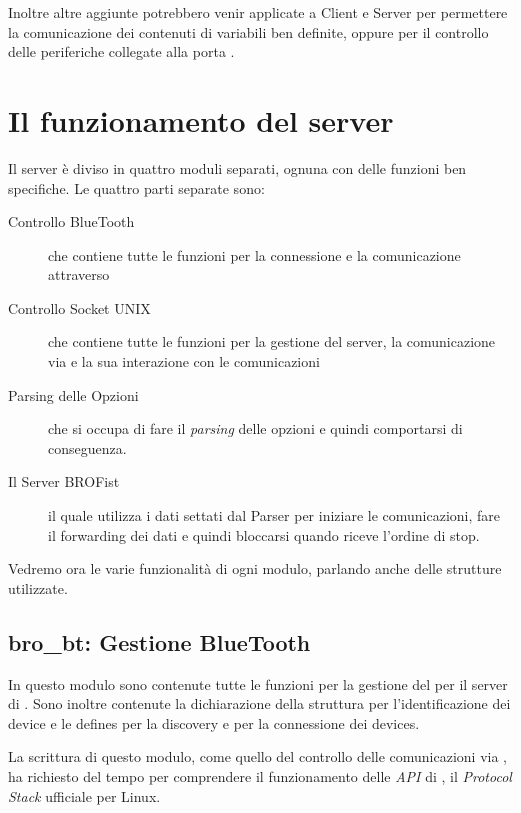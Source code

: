 Inoltre altre aggiunte potrebbero venir applicate a Client e Server per
permettere la comunicazione dei contenuti di variabili ben definite, oppure
per il controllo delle periferiche collegate alla porta .

\section{Il funzionamento del server}
Il server è diviso in quattro moduli separati, ognuna con delle funzioni
ben specifiche. Le quattro parti separate sono:

\begin{description}
    \item[Controllo BlueTooth]che contiene tutte le funzioni per la
        connessione e la comunicazione attraverso 
    \item[Controllo Socket UNIX]che contiene tutte le funzioni per la
        gestione del server, la comunicazione via  e
        la sua interazione con le comunicazioni 
    \item[Parsing delle Opzioni]che si occupa di fare il \emph{parsing}
        delle opzioni e quindi comportarsi di conseguenza.
    \item[Il Server BROFist]il quale utilizza i dati settati dal Parser per
        iniziare le comunicazioni, fare il forwarding dei dati e quindi
        bloccarsi quando riceve l'ordine di stop.
\end{description}

Vedremo ora le varie funzionalità di ogni modulo, parlando anche delle
strutture utilizzate.

\subsection[bro\_bt]{bro\_bt: Gestione BlueTooth}
In questo modulo sono contenute tutte le funzioni per la gestione del
 per il server di \BROFist{}. Sono inoltre contenute la
dichiarazione della struttura per l'identificazione dei device
 e le defines per la discovery e per la connessione dei
devices.

La scrittura di questo modulo, come quello del controllo delle
comunicazioni via , ha richiesto del tempo per
comprendere il funzionamento delle \emph{API} di , il
\emph{Protocol Stack} ufficiale per Linux.

